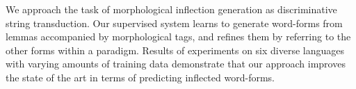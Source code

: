 We approach the task of morphological inflection generation as discriminative string transduction.  Our supervised system learns to generate word-forms from lemmas accompanied by morphological tags, and refines them by referring to the other forms within a paradigm.              Results of experiments on six diverse languages with varying amounts of training data demonstrate that our approach improves the state of the art in terms of predicting inflected word-forms.
